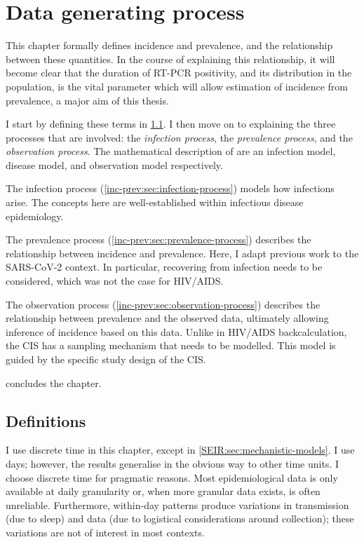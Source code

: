 \documentclass[thesis.tex]{subfiles}
\begin{document}
\ifSubfilesClassLoaded{
  \setcounter{chapter}{2}
}

\chapter{Data generating process} \label{inc-prev}

This chapter formally defines incidence and prevalence, and the relationship between these quantities.
In the course of explaining this relationship, it will become clear that the duration of RT-PCR positivity, and its distribution in the population, is the vital parameter which will allow estimation of incidence from prevalence, a major aim of this thesis.

I start by defining these terms in \cref{inc-prev:sec:definitions}.
I then move on to explaining the three processes that are involved: the \emph{infection process}, the \emph{prevalence process}, and the \emph{observation process}.
The mathematical description of are an infection model, disease model, and observation model respectively.

The infection process (\cref{inc-prev:sec:infection-process}) models how infections arise.
The concepts here are well-established within infectious disease epidemiology.

The prevalence process (\cref{inc-prev:sec:prevalence-process}) describes the relationship between incidence and prevalence.
Here, I adapt previous work to the SARS-CoV-2 context.
In particular, recovering from infection needs to be considered, which was not the case for HIV/AIDS.

The observation process (\cref{inc-prev:sec:observation-process}) describes the relationship between prevalence and the observed data, ultimately allowing inference of incidence based on this data.
Unlike in HIV/AIDS backcalculation, the CIS has a sampling mechanism that needs to be modelled.
This model is guided by the specific study design of the CIS.

 concludes the chapter.

\section{Definitions} \label{inc-prev:sec:definitions}

I use discrete time in this chapter, except in \cref{SEIR:sec:mechanistic-models}.
I use days; however, the results generalise in the obvious way to other time units.
I choose discrete time for pragmatic reasons.
Most epidemiological data is only available at daily granularity or, when more granular data exists, is often unreliable.
Furthermore, within-day patterns produce variations in transmission (\eg due to sleep) and data (\eg due to logistical considerations around collection); these variations are not of interest in most contexts.
\end{document}
